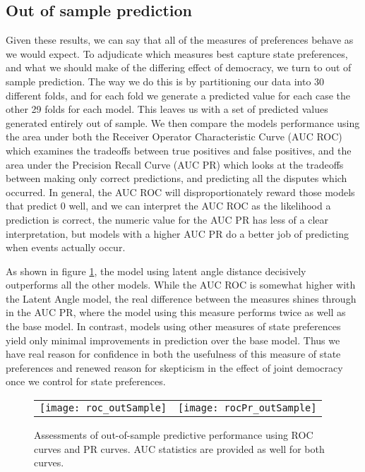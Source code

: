 \subsection{Out of sample prediction}
Given these results, we can say that all of the measures of preferences behave as we would expect. To adjudicate which measures best capture state preferences, and what we should make of the differing effect of democracy, we turn to out of sample prediction. The way we do this is by partitioning our data into 30 different folds, and for each fold we generate a predicted value for each case the other 29 folds for each model. This leaves us with a set of predicted values generated entirely out of sample. We then compare the models performance using the area under both the Receiver Operator Characteristic Curve (AUC ROC) which examines the tradeoffs between true positives and false positives, and the area under the Precision Recall Curve (AUC PR) which looks at the tradeoffs between making only correct predictions, and predicting all the disputes which occurred. In general, the AUC ROC will disproportionately reward those models that predict $0$ well, and we can interpret the AUC ROC as the likelihood a prediction is correct, the numeric value for the AUC PR has less of a clear interpretation, but models with a higher AUC PR do a better job of predicting when events actually occur.

As shown in figure \ref{fig:roc}, the model using latent angle distance decisively outperforms all the other models. While the AUC ROC is somewhat higher with the Latent Angle model, the real difference between the measures shines through in the AUC PR, where the model using this measure performs twice as well as the base model. In contrast, models using other measures of state preferences yield only minimal improvements in prediction over the base model. Thus we have real reason for confidence in both the usefulness of this measure of state preferences and renewed reason for skepticism in the effect of joint democracy once we control for state preferences. 

\begin{figure}[ht]
	\centering
	\begin{tabular}{cc}
	\texttt{[image: roc\_outSample]} & 
	\texttt{[image: rocPr\_outSample]}	
	\end{tabular}
	\caption{Assessments of out-of-sample predictive performance using ROC curves and PR curves. AUC statistics are provided as well for both curves.}
	\label{fig:roc}
\end{figure}
\FloatBarrier

